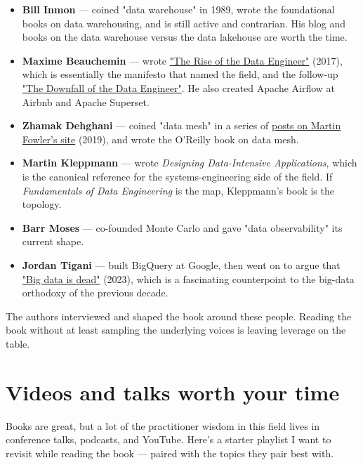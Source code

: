 \begin{itemize}[leftmargin=*]
  \item \textbf{Bill Inmon} — coined "data warehouse" in 1989, wrote the foundational books on data warehousing, and is still active and contrarian. His blog and books on the data warehouse versus the data lakehouse are worth the time.
  \item \textbf{Maxime Beauchemin} — wrote \href{https://www.freecodecamp.org/news/the-rise-of-the-data-engineer-91be18f1e603/}{"The Rise of the Data Engineer"} (2017), which is essentially the manifesto that named the field, and the follow-up \href{https://maximebeauchemin.medium.com/the-downfall-of-the-data-engineer-5bfb701e5d6b}{"The Downfall of the Data Engineer"}. He also created Apache Airflow at Airbnb and Apache Superset.
  \item \textbf{Zhamak Dehghani} — coined "data mesh" in a series of \href{https://martinfowler.com/articles/data-monolith-to-mesh.html}{posts on Martin Fowler's site} (2019), and wrote the O'Reilly book on data mesh.
  \item \textbf{Martin Kleppmann} — wrote \emph{Designing Data-Intensive Applications}, which is the canonical reference for the systems-engineering side of the field. If \emph{Fundamentals of Data Engineering} is the map, Kleppmann's book is the topology.
  \item \textbf{Barr Moses} — co-founded Monte Carlo and gave "data observability" its current shape.
  \item \textbf{Jordan Tigani} — built BigQuery at Google, then went on to argue that \href{https://motherduck.com/blog/big-data-is-dead/}{"Big data is dead"} (2023), which is a fascinating counterpoint to the big-data orthodoxy of the previous decade.
\end{itemize}

The authors interviewed and shaped the book around these people. Reading the book without at least sampling the underlying voices is leaving leverage on the table.

\section*{Videos and talks worth your time}

Books are great, but a lot of the practitioner wisdom in this field lives in conference talks, podcasts, and YouTube. Here's a starter playlist I want to revisit while reading the book — paired with the topics they pair best with.

